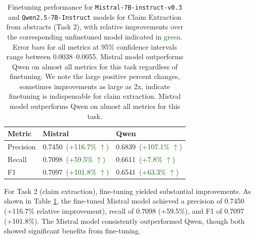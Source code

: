 \documentclass[11pt]{article}
\begin{document}
\begin{table}[h]
\centering
\small
\begin{tabular}{lll}
\toprule
Metric & Mistral & Qwen \\
\midrule
Precision
 & 0.7450 \textcolor{darkgreen}{\,(+116.7\% $\uparrow$)} 
 & 0.6839 \textcolor{darkgreen}{\,(+107.1\% $\uparrow$)} \\
Recall 
 & 0.7098 \textcolor{darkgreen}{\,(+59.5\% $\uparrow$)} 
 & 0.6611 \textcolor{darkgreen}{\,(+7.8\% $\uparrow$)} \\
F1 
 & 0.7097 \textcolor{darkgreen}{\,(+101.8\% $\uparrow$)} 
 & 0.6541 \textcolor{darkgreen}{\,(+63.3\% $\uparrow$)} \\
\bottomrule
\end{tabular}
\caption{Finetuning performance for \texttt{Mistral-7B-instruct-v0.3}
 and \texttt{Qwen2.5-7B-Instruct}
 models for Claim Extraction from abstracts (Task 2), with relative improvements over the corresponding unfinetuned model indicated in \textcolor{darkgreen}{green}. Error bars for all metrics at 95\% confidence intervals range between 0.0038--0.0055. Mistral model outperforms Qwen on almost all metrics for this task regardless of finetuning. We note the large positive percent changes, sometimes improvements as large as 2x, indicate finetuning is indispensable for claim extraction. Mistral model outperforms Qwen on almost all metrics for this task.}
\label{tab:eval_technontech2claims}
\end{table}

For Task 2 (claim extraction), fine-tuning yielded substantial improvements. As shown in Table \ref{tab:eval_technontech2claims}, the fine-tuned Mistral model achieved a precision of 0.7450 (+116.7\% relative improvement), recall of 0.7098 (+59.5\%), and F1 of 0.7097 (+101.8\%). The Mistral model consistently outperformed Qwen, though both showed significant benefits from fine-tuning.
\end{document}
